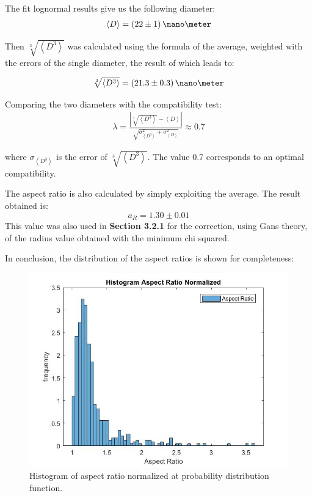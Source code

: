 \documentclass[twocolumn]{article}
\newcommand{\mean}[1]{\left\langle #1 \right\rangle}
\begin{document}
\begin{multicols}{2}
The fit lognormal results give us the following diameter:
\begin{align*}
\mean{D}=(22 \pm 1) \, \nano\meter
\end{align*}

Then $\sqrt[3]{\mean{D^3}}$ was calculated using the formula of the average, weighted with the errors of the single diameter, the result of which leads to:

\begin{align*}
\sqrt[3]{\mean{D^3}}=(21.3 \pm 0.3) \, \nano\meter
\end{align*}

Comparing the two diameters with the compatibility test:
\begin{align*}
\lambda=\frac{|\sqrt[3]{\mean{D^3}}-\mean{D}|}{\sqrt{\sigma_{\mean{D^{3}}}^{2}+\sigma_{\mean{D}}^{2}}}\approx0.7
\end{align*}

\noindent
where $\sigma_{\mean{D^3}}$ is the error of $\sqrt[3]{\mean{D^3}}$. The value 0.7 corresponds to an optimal compatibility.

The aspect ratio is also calculated by simply exploiting the average. The result obtained is:
\[a_R=1.30\pm 0.01\]
This value was also used in \textbf{Section 3.2.1} for the correction, using Gans theory, of the radius value obtained with the minimum chi squared. 

In conclusion, the distribution of the aspect ratios is shown for completeness:
\begin{figure}[H]
    \centering
    \includegraphics[width=\linewidth]{image/data/a_r distribution.jpg}
    \caption{Histogram of aspect ratio normalized at probability distribution function.}
    \label{fig:aspect_ratio}
\end{figure}



\end{multicols}
\end{document}
